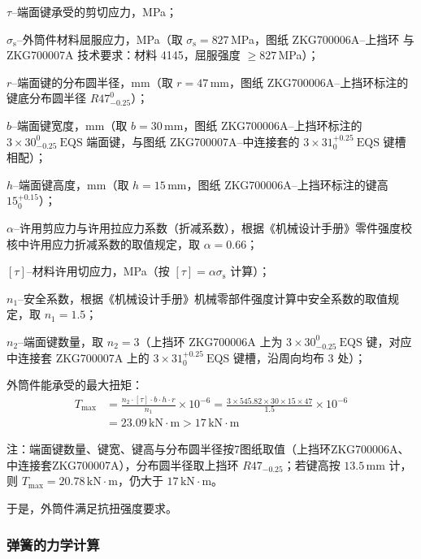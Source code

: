 $\tau$--端面键承受的剪切应力，MPa；

$\sigma_{\mathrm{s}}$--外筒件材料屈服应力，MPa（取 $\sigma_{\mathrm{s}}=827$\,MPa，图纸 ZKG700006A--上挡环 与 ZKG700007A 技术要求：材料 4145，屈服强度 $\ge 827$\,MPa）；
    
$r$--端面键的分布圆半径，mm（取 $r=47$\,mm，图纸 ZKG700006A--上挡环标注的键底分布圆半径 $R47_{-0.25}^{0}$）；
    
$b$--端面键宽度，mm（取 $b=30$\,mm，图纸 ZKG700006A--上挡环标注的 $3\times30_{-0.25}^{0}\ \text{EQS}$ 端面键，与图纸 ZKG700007A--中连接套的 $3\times31_{0}^{+0.25}\ \text{EQS}$ 键槽相配）；
    
$h$--端面键高度，mm（取 $h=15$\,mm，图纸 ZKG700006A--上挡环标注的键高 $15_{0}^{+0.15}$）；
    
$\alpha$--许用剪应力与许用拉应力系数（折减系数），根据《机械设计手册》零件强度校核中许用应力折减系数的取值规定\cite{ref26}，取 $\alpha=0.66$；
    
$[\tau]$--材料许用切应力，MPa（按 $[\tau]=\alpha\sigma_{\mathrm{s}}$ 计算）；
    
$n_1$--安全系数，根据《机械设计手册》机械零部件强度计算中安全系数的取值规定\cite{ref26}，取 $n_1=1.5$；
    
$n_2$--端面键数量，取 $n_2=3$（上挡环 ZKG700006A 上为 $3\times30_{-0.25}^0\ \text{EQS}$ 键，对应中连接套 ZKG700007A 上的 $3\times31^{+0.25}_0\ \text{EQS}$ 键槽，沿周向均布 3 处）；


外筒件能承受的最大扭矩：
\begin{equation}
\begin{aligned}
T_{\text{max}}&=\frac{n_2\cdot [\tau]\cdot b\cdot h\cdot r}{n_1}\times 10^{-6}
=\frac{3\times 545.82\times 30\times 15\times 47}{1.5}\times 10^{-6}\\
&=23.09\,\text{kN}\cdot\text{m} > 17\,\text{kN}\cdot\text{m}
\end{aligned}
\end{equation}

注：端面键数量、键宽、键高与分布圆半径按7\inch 图纸取值（上挡环ZKG700006A、中连接套ZKG700007A），分布圆半径取上挡环 $R47_{-0.25}$；若键高按 $13.5\,\text{mm}$ 计，则 $T_{\text{max}}=20.78\,\text{kN}\cdot\text{m}$，仍大于 $17\,\text{kN}\cdot\text{m}$。


于是，外筒件满足抗扭强度要求。

\subsubsection{弹簧的力学计算}

